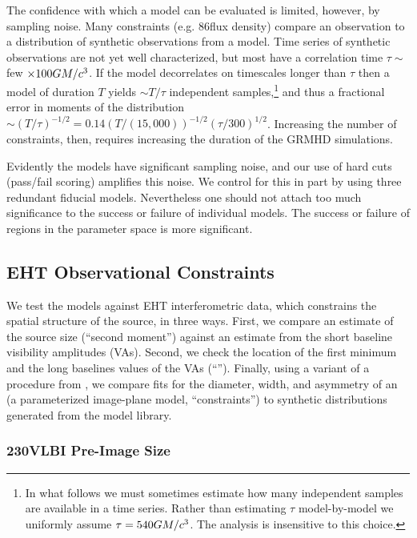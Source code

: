The confidence with which a model can be evaluated is limited, however, by sampling noise.  Many constraints (e.g. 86\GHz flux density) compare an observation to a distribution of synthetic observations from a model.  Time series of synthetic observations are not yet well characterized, but most have a correlation time $\tau\sim$ few $\times 100 GM/c^3$.  If the model decorrelates on timescales longer than $\tau$ then a model of duration $T$ yields $\sim T/\tau$ independent samples,\footnote{In what follows we must sometimes estimate how many independent samples are available in a time series.  Rather than estimating $\tau$  model-by-model we uniformly assume $\tau = 540 GM/c^3$.  The analysis is insensitive to this choice.} and thus a fractional error in moments of the distribution $\sim (T/\tau)^{-1/2} = 0.14 (T/(15,000))^{-1/2}(\tau/300)^{1/2}$.  Increasing the number of constraints, then, requires increasing the duration of the GRMHD simulations.

Evidently the models have significant sampling noise, and our use of hard cuts (pass/fail scoring) amplifies this noise.  We control for this in part by using three redundant fiducial models.  Nevertheless one should not attach too much significance to the success or failure of individual models.  The success or failure of regions in the parameter space is more significant.

\subsection{EHT Observational Constraints}

We test the models against EHT interferometric data, which constrains the spatial structure of the source, in three ways.
First, we compare an estimate of the source size (``second moment'')
against an estimate from the short baseline visibility amplitudes (VAs).
Second, we check the location of the first minimum and the long
baselines values of the VAs (``\vam'').
Finally, using a variant of a procedure from , we
compare fits for the diameter, width, and asymmetry of an \mring (a parameterized image-plane model, ``\mring constraints'') to synthetic distributions generated from the model library.

\subsubsection{230\GHz VLBI Pre-Image Size}
\label{sec:sz}

